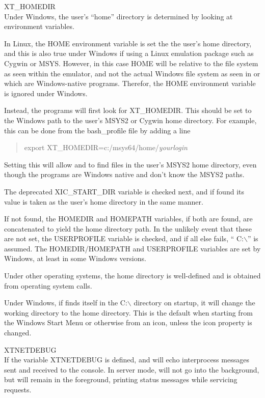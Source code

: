 \begin{description}
\item{\et XT\_HOMEDIR}\\
Under Windows, the user's ``home'' directory is determined by looking
at environment variables.

In Linux, the {\et HOME} environment variable is set the the user's home
directory, and this is also true under Windows if using a Linux emulation
package such as Cygwin or MSYS.  However, in this case {\et HOME} will be
relative to the file system as seen within the emulator, and not the
actual Windows file system as seen in {\Xic} or {\WRspice} which are
Windows-native programs.  Therefor, the {\et HOME} environment variable
is ignored under Windows.

Instead, the programs will first look for {\et XT\_HOMEDIR}.  This
should be set to the Windows path to the user's MSYS2 or Cygwin home
directory.  For example, this can be done from the {\vt bash\_profile}
file by adding a line
\begin{quote}
{\vt export XT\_HOMEDIR=c:/msys64/home/}{\it yourlogin}
\end{quote}
Setting this will allow {\Xic} and {\WRspice} to find files in the
user's MSYS2 home directory, even though the programs are Windows
native and don't know the MSYS2 paths.

The deprecated {\et XIC\_START\_DIR} variable is checked next, and if
found its value is taken as the user's home directory in the same
manner.

If not found, the {\et HOMEDIR} and {\et HOMEPATH}
variables, if both are found, are concatenated to yield the home
directory path.  In the unlikely event that these are not set, the
{\et USERPROFILE} variable is checked, and if all else fails, ``{\vt
C:$\backslash$}'' is assumed.  The {\et HOMEDIR}/{\et HOMEPATH} and
{\et USERPROFILE} variables are set by Windows, at least in some
Windows versions.

Under other operating systems, the home directory is well-defined
and is obtained from operating system calls.

Under Windows, if {\Xic} finds itself in the {\vt C:$\backslash$}
directory on startup, it will change the working directory to the home
directory.  This is the default when starting from the Windows {\cb
Start Menu} or otherwise from an icon, unless the icon property is
changed.

\item{\et XTNETDEBUG}\\
If the variable {\et XTNETDEBUG} is defined, {\Xic} and {\WRspice}
will echo interprocess messages sent and received to the console.  In
server mode, {\Xic} will not go into the background, but will remain
in the foreground, printing status messages while servicing requests.


\end{description}
